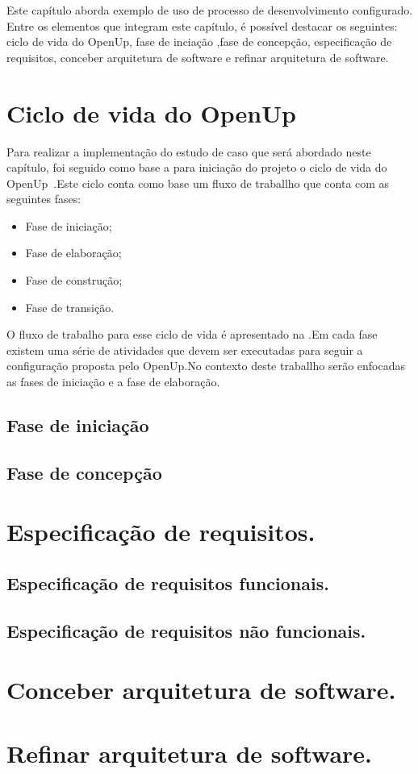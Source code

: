 Este capítulo aborda exemplo de uso de processo de desenvolvimento configurado. Entre os elementos que integram este capítulo, é possível destacar os seguintes: ciclo de vida do OpenUp, fase de inciação ,fase de concepção, especificação de requisitos, conceber arquitetura de software e refinar arquitetura de software.

\section{Ciclo de vida do OpenUp}

Para realizar a implementação do estudo de caso que será abordado neste capítulo, foi seguido como base a para iniciação do projeto o ciclo de vida do OpenUp~\cite{openup}.Este ciclo conta como base um fluxo de traballho que conta com as seguintes fases:
\begin{itemize}
    \item Fase de iniciação;
    \item Fase de elaboração;
    \item Fase de construção;
    \item Fase de transição.
\end{itemize}

%

O fluxo de trabalho para esse ciclo de vida é apresentado na .Em cada fase existem uma série de atividades que devem ser executadas para seguir a configuração proposta pelo OpenUp.No contexto deste traballho serão enfocadas as fases de iniciação e a fase de elaboração.

\subsection{Fase de iniciação}
\subsection{Fase de concepção}
\section{Especificação de requisitos.}
\subsection{Especificação de requisitos funcionais.}
\subsection{Especificação de requisitos não funcionais.}
\section{Conceber arquitetura de software.}
\section{Refinar arquitetura de software.}